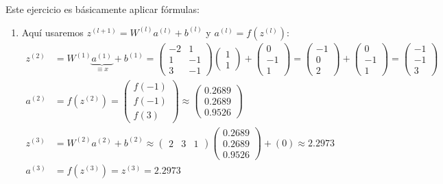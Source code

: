 \noindent Este ejercicio es básicamente aplicar fórmulas:
\begin{enumerate}
\item Aquí usaremos $z^{(l+1)} = W^{(l)}a^{(l)} + b^{(l)}$ y $a^{(l)} = f(z^{(l)})$:
\begin{align*}
z^{(2)} &= W^{(1)}\underbrace{a^{(1)}}_{\equiv x} + b^{(1)} = \begin{pmatrix} -2 & 1 \\ 1 & -1 \\ 3 & -1 \end{pmatrix} \begin{pmatrix} 1 \\ 1 \end{pmatrix} + \begin{pmatrix} 0 \\ -1 \\ 1 \end{pmatrix} = \begin{pmatrix} -1 \\ 0 \\ 2 \end{pmatrix} + \begin{pmatrix} 0 \\ -1 \\ 1 \end{pmatrix} = \begin{pmatrix} -1 \\ -1 \\ 3 \end{pmatrix} \\
a^{(2)} &= f(z^{(2)}) = \begin{pmatrix} f(-1) \\ f(-1) \\ f(3) \end{pmatrix} \approx \begin{pmatrix} 0.2689 \\ 0.2689 \\ 0.9526 \end{pmatrix} \\
z^{(3)} &= W^{(2)}a^{(2)} + b^{(2)} \approx \begin{pmatrix} 2 & 3 & 1 \end{pmatrix} \begin{pmatrix} 0.2689 \\ 0.2689 \\ 0.9526 \end{pmatrix} + (0) \approx 2.2973 \\
a^{(3)} &= f(z^{(3)}) = z^{(3)} = 2.2973
\end{align*}

\end{enumerate}
